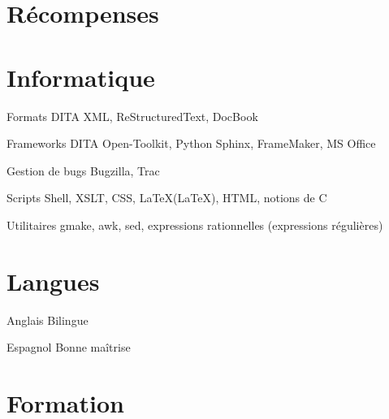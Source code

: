 \documentclass[11pt,a4paper,roman]{moderncv}
\begin{document}

\section{Récompenses}



\section{Informatique}

\cvitem
    {Formats}
    {DITA XML, ReStructuredText, DocBook}

\cvitem
    {Frameworks}
    {DITA Open-Toolkit, Python Sphinx, FrameMaker, MS Office}

\cvitem
    {Gestion de bugs}
    {Bugzilla, Trac}

 {Scripts Shell, XSLT, CSS, \LaTeX (LaTeX), HTML, notions de
  C}

\cvitem
    {Utilitaires}
    {gmake, awk, sed, expressions rationnelles (expressions
      régulières)}


\section{Langues}

\cvitem
    {Anglais}
    {Bilingue}

\cvitem
    {Espagnol}
    {Bonne maîtrise}


\section{Formation}
\end{document}
